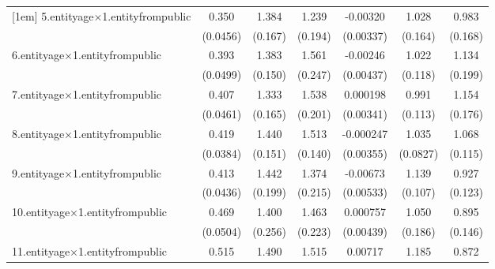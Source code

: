 {\begin{tabular}{l*{6}{c}}
[1em]
5.entityage$\times$1.entityfrompublic&       0.350\sym{***}&       1.384\sym{***}&       1.239\sym{***}&    -0.00320         &       1.028\sym{***}&       0.983\sym{***}\\
            &    (0.0456)         &     (0.167)         &     (0.194)         &   (0.00337)         &     (0.164)         &     (0.168)         \\
[1em]
6.entityage$\times$1.entityfrompublic&       0.393\sym{***}&       1.383\sym{***}&       1.561\sym{***}&    -0.00246         &       1.022\sym{***}&       1.134\sym{***}\\
            &    (0.0499)         &     (0.150)         &     (0.247)         &   (0.00437)         &     (0.118)         &     (0.199)         \\
[1em]
7.entityage$\times$1.entityfrompublic&       0.407\sym{***}&       1.333\sym{***}&       1.538\sym{***}&    0.000198         &       0.991\sym{***}&       1.154\sym{***}\\
            &    (0.0461)         &     (0.165)         &     (0.201)         &   (0.00341)         &     (0.113)         &     (0.176)         \\
[1em]
8.entityage$\times$1.entityfrompublic&       0.419\sym{***}&       1.440\sym{***}&       1.513\sym{***}&   -0.000247         &       1.035\sym{***}&       1.068\sym{***}\\
            &    (0.0384)         &     (0.151)         &     (0.140)         &   (0.00355)         &    (0.0827)         &     (0.115)         \\
[1em]
9.entityage$\times$1.entityfrompublic&       0.413\sym{***}&       1.442\sym{***}&       1.374\sym{***}&    -0.00673         &       1.139\sym{***}&       0.927\sym{***}\\
            &    (0.0436)         &     (0.199)         &     (0.215)         &   (0.00533)         &     (0.107)         &     (0.123)         \\
[1em]
10.entityage$\times$1.entityfrompublic&       0.469\sym{***}&       1.400\sym{***}&       1.463\sym{***}&    0.000757         &       1.050\sym{***}&       0.895\sym{***}\\
            &    (0.0504)         &     (0.256)         &     (0.223)         &   (0.00439)         &     (0.186)         &     (0.146)         \\
[1em]
11.entityage$\times$1.entityfrompublic&       0.515\sym{***}&       1.490\sym{***}&       1.515\sym{***}&     0.00717         &       1.185\sym{***}&       0.872\sym{***}\\

\end{tabular}}
